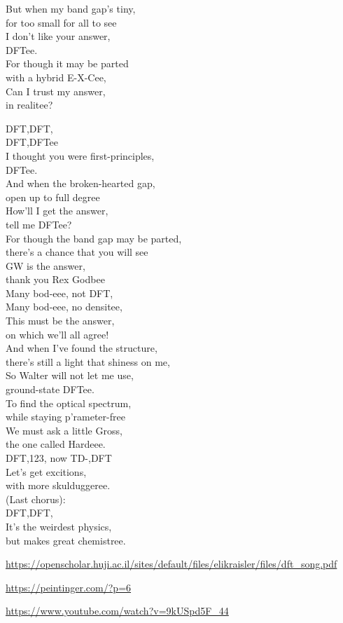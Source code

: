 But when my band gap's tiny,\\
for too small for all to see\\
I don't like your answer,\\
DFTee.\\
For though it may be parted\\
with a hybrid E-X-Cee,\\
Can I trust my answer,\\
in realitee?

DFT,DFT,\\
DFT,DFTee\\
I thought you were first-principles,\\
DFTee.\\

And when the broken-hearted gap,\\
open up to full degree\\
How'll I get the answer,\\
tell me DFTee?\\
For though the band gap may be parted,\\
there's a chance that you will see\\
GW is the answer,\\
thank you Rex Godbee\\

Many bod-eee, not DFT,\\
Many bod-eee, no densitee,\\
This must be the answer,\\
on which we'll all agree!\\

And when I've found the structure,\\
there's still a light that shiness on me,\\
So Walter will not let me use,\\
ground-state DFTee.\\
To find the optical spectrum,\\
while staying p'rameter-free\\
We must ask a little Gross,\\
the one called Hardeee.\\

DFT,123,
now TD-,DFT\\
Let's get excitions,\\
with more skulduggeree.\\

(Last chorus):\\
DFT,DFT,\\
It's the weirdest physics,\\
but makes great chemistree.

\url{https://openscholar.huji.ac.il/sites/default/files/elikraisler/files/dft_song.pdf}

\url{https://peintinger.com/?p=6}

\url{https://www.youtube.com/watch?v=9kUSpd5F_44}
